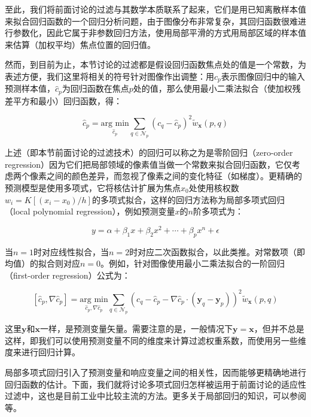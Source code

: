 至此，我们将前面讨论的过滤与其数学本质联系了起来，它们是用已知离散样本值来拟合回归函数的一个回归分析问题，由于图像分布非常复杂，其回归函数很难进行参数化，因此它属于非参数回归方法，使用局部平滑的方式用局部区域的样本值来估算（加权平均）焦点位置的回归值。

然而，到目前为止，本节讨论的过滤都是假设回归函数焦点处的值是一个常数，为表述方便，我们这里将相关的符号针对图像作出调整：用$c_p$表示图像回归中的输入预测样本值，$\hat{c}_p$为回归函数在焦点$p$处的值，那么使用最小二乘法拟合（使加权残差平方和最小）回归函数，得：

\begin{equation}
	\hat{c}_p=\underset{\hat{c}_p}{\text{arg min}}\sum_{q\in\mathcal{N}_p}(c_q-\hat{c}_p)^{2}\tilde{w}_\mathbf{x}(p,q)
\end{equation}

上述（即本节前面讨论的过滤技术）的回归可以称之为是零阶回归（zero-order regression）因为它们把局部领域的像素值当做一个常数来拟合回归函数，它仅考虑两个像素之间的颜色差异，而忽视了像素之间的变化特征（如梯度）。更精确的预测模型是使用多项式，它将核估计扩展为焦点$x_0$处使用核权数$w_i=K[(x_i-x_0)/h]$的多项式拟合，这样的回归方法称为局部多项式回归（local polynomial regression），例如预测变量$x$的$n$阶多项式为：

\begin{equation}
	y=\alpha+\beta_1 x+\beta_2 x^{2}+\cdots+\beta_p x^{n}+\epsilon
\end{equation}

当$n=1$时对应线性拟合，当$n=2$时对应二次函数拟合，以此类推。对常数项（即均值）的拟合则对应$n=0$。例如，针对图像使用最小二乘法拟合的一阶回归（first-order regression）公式为：

\begin{equation}\label{e:pt-first-order-regression}
	[\hat{c}_p,\nabla\hat{c}_p]=\underset{\hat{c}_p,\nabla\hat{c}_p}{\text{arg min}}\sum_{q\in\mathcal{N}_p}(c_q-\hat{c}_p-\nabla\hat{c}_p\cdot (\mathbf{y}_q-\mathbf{y}_p))^{2}\tilde{w}_\mathbf{x}(p,q)
\end{equation}

\noindent 这里$\mathbf{y}$和$\mathbf{x}$一样，是预测变量矢量。需要注意的是，一般情况下$\mathbf{y}=\mathbf{x}$，但并不总是这样，即我们可以使用预测变量不同的维度来计算过滤权重系数，而使用另一些维度来进行回归计算。

局部多项式回归引入了预测变量和响应变量之间的相关性，因而能够更精确地进行回归函数的估计。下面，我们就将讨论多项式回归怎样被运用于前面讨论的适应性过滤中，这也是目前工业中比较主流的方法。更多关于局部回归的知识，可以参阅\cite{b:LocalRegressionandLikelihood, b:nonparametricregression,a:SmoothingbyLocalRegression:PrinciplesandMethods}等。







